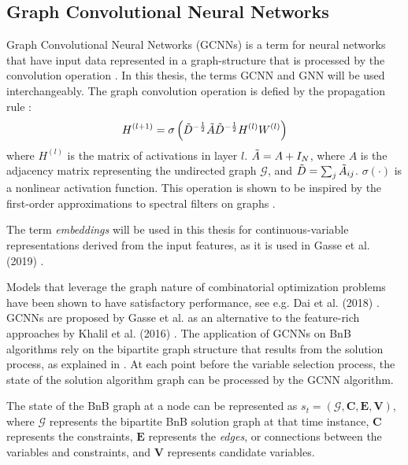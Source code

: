 \subsection{Graph Convolutional Neural Networks }

Graph Convolutional Neural Networks (\gls{GCNN}s) is a term for neural networks that have input data represented in a graph-structure that is processed by the convolution operation \cite{kipf2016semisupervised}. In this thesis, the terms \gls{GCNN} and \gls{GNN} will be used interchangeably. The graph convolution operation is defied by the propagation rule \cite{kipf2016semisupervised}:
\begin{equation}
    H^{(l+1)} = \sigma \left( \Tilde{D}^{-\frac{1}{2}} \Tilde{A} \Tilde{D}^{-\frac{1}{2}} H^{(l)}W^{(l)}\right)
\end{equation}
where $H^{(l)}$ is the matrix of activations in layer $l$. $\Tilde{A} = A + I_N$, where $A$ is the adjacency matrix representing the undirected graph $\mathcal{G}$, and $\Tilde{D} = \sum_j \Tilde{A}_{i j}$. $\sigma( \cdot) $ is a nonlinear activation function.
This operation is shown to be inspired by the first-order approximations to spectral filters on graphs \cite{kipf2016semisupervised}.

The term \textit{embeddings} will be used in this thesis for continuous-variable representations derived from the input features, as it is used in Gasse et al. (2019) \cite{gasse2019exact}. 





Models that leverage the graph nature of combinatorial optimization problems have been shown to have satisfactory performance, see e.g. Dai et al. (2018) \cite{dai2018learning}. 
\gls{GCNN}s are proposed by Gasse et al. \cite{gasse2019exact} as an alternative to the feature-rich approaches by Khalil et al. (2016) \cite{khalil2016learning}. 
The application of \gls{GCNN}s on \gls{BnB} algorithms rely on the bipartite graph structure that results from the solution process, as explained in . At each point before the variable selection process, the state of the solution algorithm graph can be processed by the \gls{GCNN} algorithm. 

The state of the \gls{BnB} graph at a node can be represented as $s_t = (\mathcal{G}, \mathbf{C}, \mathbf{E}, \mathbf{V})$, where $\mathcal{G}$ represents the bipartite \gls{BnB} solution graph at that time instance, $\mathbf{C}$ represents the constraints, $\mathbf{E}$ represents the \textit{edges}, or connections between the variables and constraints, and $\mathbf{V}$ represents candidate variables.  

